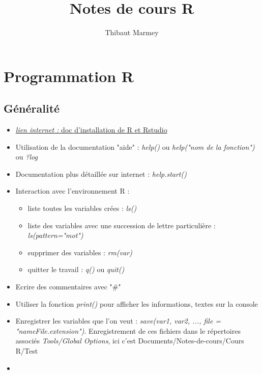 \documentclass[12pt,a4paper]{article}
\author{Thibaut Marmey}
\title{Notes de cours R}
\begin{document}
	\maketitle

\begin{normalsize}
\tableofcontents
\end{normalsize}

\section{Programmation R}
\subsection{Généralité}
\begin{itemize}
\item \href{https://linuxconfig.org/rstudio-on-ubuntu-18-04-bionic-beaver-linux}{\textit{lien internet : }doc d'installation de R et Rstudio}
\item Utilisation de la documentation "aide" : \textit{help()} ou \textit{help("nom de la fonction")} ou  \textit{?log}
\item Documentation plus détaillée sur internet : \textit{help.start()}
\item Interaction avec l'environnement R :
\begin{itemize}
\item liste toutes les variables crées : \textit{ls()}
\item liste des variables avec une succession de lettre particulière : \textit{ls(pattern="mot")}
\item supprimer des variables : \textit{rm(var)}\\
\item quitter le travail : \textit{q()} ou \textit{quit()}
\end{itemize}
\item Ecrire des commentaires avec "\#"
\item Utiliser la fonction \textit{print()} pour afficher les informations, textes sur la console
\item Enregistrer les variables que l'on veut : \textit{save(var1, var2, ..., file = "nameFile.extension")}.
\newline Enregistrement de ces fichiers dans le répertoires associés \textit{Tools/Global Options}, ici c'est Documents/Notes-de-cours/Cours R/Test
\item 
\end{itemize}
\end{document}
